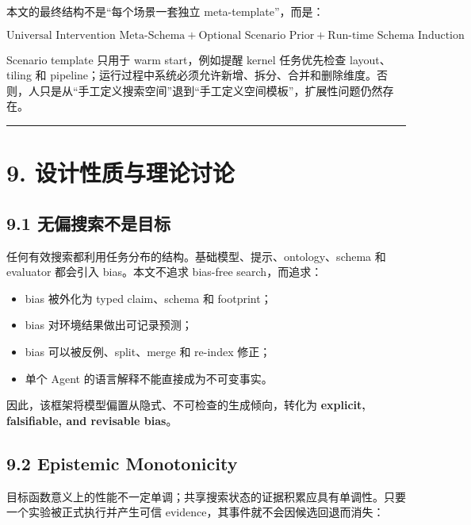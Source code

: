 \documentclass[
  11pt]{ctexart}
\providecommand{\tightlist}{%
  \setlength{\itemsep}{0pt}\setlength{\parskip}{0pt}}
\begin{document}
本文的最终结构不是``每个场景一套独立 meta-template''，而是：

\[
\boxed{
\text{Universal Intervention Meta-Schema}
+
\text{Optional Scenario Prior}
+
\text{Run-time Schema Induction}
}
\]

Scenario template 只用于 warm start，例如提醒 kernel 任务优先检查
layout、tiling 和
pipeline；运行过程中系统必须允许新增、拆分、合并和删除维度。否则，人只是从``手工定义搜索空间''退到``手工定义空间模板''，扩展性问题仍然存在。

\begin{center}\rule{0.5\linewidth}{0.5pt}\end{center}

\section{9.
设计性质与理论讨论}\label{ux8bbeux8ba1ux6027ux8d28ux4e0eux7406ux8bbaux8ba8ux8bba}

\subsection{9.1
无偏搜索不是目标}\label{ux65e0ux504fux641cux7d22ux4e0dux662fux76eeux6807}

任何有效搜索都利用任务分布的结构。基础模型、提示、ontology、schema 和
evaluator 都会引入 bias。本文不追求 bias-free search，而追求：

\begin{itemize}
\tightlist
\item
  bias 被外化为 typed claim、schema 和 footprint；
\item
  bias 对环境结果做出可记录预测；
\item
  bias 可以被反例、split、merge 和 re-index 修正；
\item
  单个 Agent 的语言解释不能直接成为不可变事实。
\end{itemize}

因此，该框架将模型偏置从隐式、不可检查的生成倾向，转化为
\textbf{explicit, falsifiable, and revisable bias}。

\subsection{9.2 Epistemic Monotonicity}\label{epistemic-monotonicity}

目标函数意义上的性能不一定单调；共享搜索状态的证据积累应具有单调性。只要一个实验被正式执行并产生可信
evidence，其事件就不会因候选回退而消失：
\end{document}
